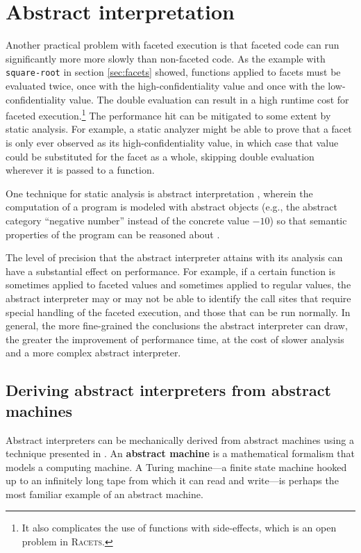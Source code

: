 \documentclass{article}
\begin{document}
\section{Abstract interpretation\label{sec:ai}}
Another practical problem with faceted execution is that faceted code can run significantly more more slowly than non-faceted code. As the example with \texttt{square-root} in section \ref{sec:facets} showed, functions applied to facets must be evaluated twice, once with the high-confidentiality value and once with the low-confidentiality value. The double evaluation can result in a high runtime cost for faceted execution.\footnote{It also complicates the use of functions with side-effects, which is an open problem in \textsc{Racets}.} The performance hit can be mitigated to some extent by static analysis. For example, a static analyzer might be able to prove that a facet is only ever observed as its high-confidentiality value, in which case that value could be substituted for the facet as a whole, skipping double evaluation wherever it is passed to a function.

One technique for static analysis is abstract interpretation \cite{abstract-inter}, wherein the computation of a program is modeled with abstract objects (e.g., the abstract category ``negative number'' instead of the concrete value $-10$) so that semantic properties of the program can be reasoned about \cite{ai-original}.

The level of precision that the abstract interpreter attains with its analysis can have a substantial effect on performance. For example, if a certain function is sometimes applied to faceted values and sometimes applied to regular values, the abstract interpreter may or may not be able to identify the call sites that require special handling of the faceted execution, and those that can be run normally. In general, the more fine-grained the conclusions the abstract interpreter can draw, the greater the improvement of performance time, at the cost of slower analysis and a more complex abstract interpreter.


\subsection{Deriving abstract interpreters from abstract machines}
Abstract interpreters can be mechanically derived from abstract machines using a technique presented in \cite{aam}. An \textbf{abstract machine} is a mathematical formalism that models a computing machine. A Turing machine---a finite state machine hooked up to an infinitely long tape from which it can read and write---is perhaps the most familiar example of an abstract machine.
\end{document}
